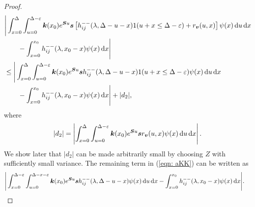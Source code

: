 \begin{proof}
	\begin{align}
		&\Bigg|\int_{x=0}^{\Delta}\int_{u=0}^{\Delta-\varepsilon} \boldsymbol k(x_0)e^{\boldsymbol Su}\boldsymbol s \left[ h_{ij}^{--}(\lambda, \Delta - u - x)1(u+x\leq \Delta-\varepsilon) + r_{\boldsymbol v}(u,x) \right] \psi(x) \, \mathrm{d} u \, \mathrm{d} x \nonumber
		\\&{}\qquad {} - \int_{x=0}^{x_0} h_{ij}^{--}(\lambda, x_0 - x)\psi(x)\, \mathrm{d} x \Bigg|\nonumber
		\\&\leq \Bigg|\int_{x=0}^{\Delta}\int_{u=0}^{\Delta-\varepsilon} \boldsymbol k(x_0)e^{\boldsymbol Su}\boldsymbol s h_{ij}^{--}(\lambda, \Delta - u - x)1(u+x\leq \Delta-\varepsilon) \psi(x) \, \mathrm{d} u \, \mathrm{d} x \nonumber 
		\\&\qquad{} - \int_{x=0}^{x_0} h_{ij}^{--}(\lambda, x_0 - x)\psi(x)\, \mathrm{d} x \Bigg| + |d_2|,
		\label{eqn: aKK}
	\end{align}
	where 
	\[|d_2| = \left| \int_{x=0}^{\Delta}\int_{u=0}^{\Delta-\varepsilon} \boldsymbol k(x_0)e^{\boldsymbol Su}\boldsymbol s r_{\boldsymbol v}(u,x) \psi(x) \, \mathrm{d} u \, \mathrm{d} x \right|.\]
	We show later that \(|d_2|\) can be made arbitrarily small by choosing \(Z\) with sufficiently small variance. The remaining term in (\ref{eqn: aKK}) can be written as 
	\begin{align}
		&\Bigg|\int_{x=0}^{\Delta-\varepsilon}\int_{u=0}^{\Delta-x-\varepsilon} \boldsymbol k(x_0)e^{\boldsymbol Su}\boldsymbol s h_{ij}^{--}(\lambda, \Delta - u - x) \psi(x) \, \mathrm{d} u \, \mathrm{d} x 
		- \int_{x=0}^{x_0} h_{ij}^{--}(\lambda, x_0 - x)\psi(x)\, \mathrm{d} x \Bigg|.\label{eqn: FGHJKL}
	\end{align}
	


\end{proof}
